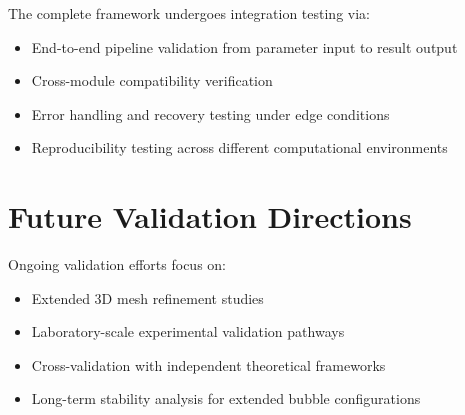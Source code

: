 \documentclass[12pt]{article}
\begin{document}
The complete framework undergoes integration testing via:
\begin{itemize}
\item End-to-end pipeline validation from parameter input to result output
\item Cross-module compatibility verification
\item Error handling and recovery testing under edge conditions
\item Reproducibility testing across different computational environments
\end{itemize}

\section{Future Validation Directions}

Ongoing validation efforts focus on:
\begin{itemize}
\item Extended 3D mesh refinement studies
\item Laboratory-scale experimental validation pathways
\item Cross-validation with independent theoretical frameworks
\item Long-term stability analysis for extended bubble configurations
\end{itemize}
\end{document}
